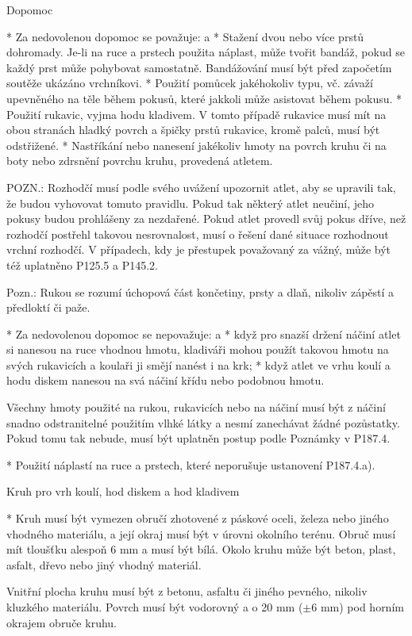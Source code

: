 Dopomoc

* Za nedovolenou dopomoc se považuje:
  \begitems \style a
  * Stažení dvou nebo více prstů dohromady. Je-li na ruce a prstech použita náplast, může tvořit bandáž, pokud se každý prst může pohybovat samostatně. Bandážování musí být před započetím soutěže ukázáno vrchníkovi.
  * Použití pomůcek jakéhokoliv typu, vč. závaží upevněného na těle během pokusů, které jakkoli může asistovat během pokusu.
  * Použití rukavic, vyjma hodu kladivem. V tomto případě rukavice musí mít na obou stranách hladký povrch a špičky prstů rukavice, kromě palců, musí být odstřižené.
  * Nastříkání nebo nanesení jakékoliv hmoty na povrch kruhu či na boty nebo zdrsnění povrchu kruhu, provedená atletem.
  \enditems

POZN.: Rozhodčí musí podle svého uvážení upozornit atlet, aby se upravili tak, že budou vyhovovat tomuto pravidlu. Pokud tak některý atlet neučiní, jeho pokusy budou prohlášeny za nezdařené. Pokud atlet provedl svůj pokus dříve, než rozhodčí postřehl takovou nesrovnalost, musí o řešení dané situace rozhodnout vrchní rozhodčí. V případech, kdy je přestupek považovaný za vážný, může být též uplatněno P125.5 a P145.2.

Pozn.: Rukou se rozumí úchopová část končetiny, prsty a dlaň, nikoliv zápěstí a předloktí či paže.

* Za nedovolenou dopomoc se nepovažuje:
  \begitems \style a
  * když pro snazší držení náčiní atlet si nanesou na ruce vhodnou hmotu, kladiváři mohou použít takovou hmotu na svých rukavicích a koulaři ji smějí nanést i na krk;
  * když atlet ve vrhu koulí a hodu diskem nanesou na svá náčiní křídu nebo podobnou hmotu.

  Všechny hmoty použité na rukou, rukavicích nebo na náčiní musí být z náčiní snadno odstranitelné použitím vlhké látky a nesmí zanechávat žádné pozůstatky. Pokud tomu tak nebude, musí být uplatněn postup podle Poznámky v P187.4.

  * Použití náplastí na ruce a prstech, které neporušuje ustanovení P187.4.a).
  \enditems

Kruh pro vrh koulí, hod diskem a hod kladivem

* Kruh musí být vymezen obručí zhotovené z páskové oceli, železa nebo jiného vhodného materiálu, a její okraj musí být v úrovni okolního terénu. Obruč musí mít tloušťku alespoň 6 mm a musí být bílá. Okolo kruhu může být beton, plast, asfalt, dřevo nebo jiný vhodný materiál.

Vnitřní plocha kruhu musí být z betonu, asfaltu či jiného pevného, nikoliv kluzkého materiálu. Povrch musí být vodorovný a o 20 mm ($\pm$6 mm) pod horním okrajem obruče kruhu.


